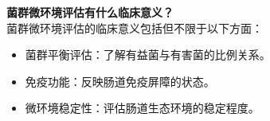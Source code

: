 \documentclass[UTF8]{ctexart}
\begin{document}
\begin{tcolorbox}[
    enhanced,
    colback=lightpurple!10, %
    colframe=white,  %
    arc=3mm,
    boxrule=0.5pt,
    width=\textwidth,
    top=8pt,
    bottom=8pt
]
{\small{\color{lightpurple}\faQuestionCircle}\quad \textbf{菌群微环境评估有什么临床意义？}\\
{\color{orange!50}\faComments}\quad 菌群微环境评估的临床意义包括但不限于以下方面：
\begin{itemize}
    \item 菌群平衡评估：了解有益菌与有害菌的比例关系。
    \item 免疫功能：反映肠道免疫屏障的状态。
    \item 微环境稳定性：评估肠道生态环境的稳定程度。
\end{itemize}
}
\end{tcolorbox}
\vspace{-0.5cm}
\end{document}
